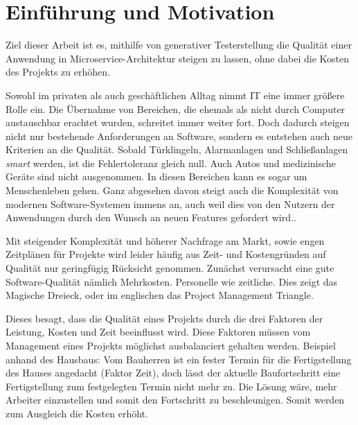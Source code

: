 \documentclass[12pt,a4paper,bibliography=totocnumbered,listof=totocnumbered]{scrartcl}
\begin{document}
\onehalfspacing
\renewcommand{\thesection}{\arabic{section}}
\renewcommand{\theHsection}{\arabic{section}}
\setcounter{section}{0}
\setcounter{page}{1}
\setcounter{secnumdepth}{6}

\section{Einführung und Motivation}

Ziel dieser Arbeit ist es, mithilfe von generativer Testerstellung die Qualität einer Anwendung in Microservice-Architektur steigen zu lassen, ohne dabei die Kosten des Projekts zu erhöhen.

Sowohl im privaten als auch geschäftlichen Alltag nimmt IT eine immer größere Rolle ein. Die Übernahme von Bereichen, die ehemals als nicht durch Computer austauschbar erachtet wurden, schreitet immer weiter fort. Doch dadurch steigen nicht nur bestehende Anforderungen an Software, sondern es entstehen auch neue Kriterien an die Qualität. Sobald Türklingeln, Alarmanlagen und Schließanlagen \textit{smart} werden, ist die Fehlertoleranz gleich null. Auch Autos und medizinische Geräte sind nicht ausgenommen. In diesen Bereichen kann es sogar um Menschenleben gehen. Ganz abgesehen davon steigt auch die Komplexität von modernen Software-Systemen immens an, auch weil dies von den Nutzern der Anwendungen durch den Wunsch an neuen Features gefordert wird.\cite{pantesting}.

Mit steigender Komplexität und höherer Nachfrage am Markt, sowie engen Zeitplänen für Projekte wird leider häufig aus Zeit- und Kostengründen auf Qualität nur geringfügig Rücksicht genommen. Zunächst verursacht eine gute Software-Qualität nämlich Mehrkosten. Personelle wie zeitliche. Dies zeigt das Magische Dreieck, oder im englischen das Project Management Triangle.


Dieses besagt, dass die Qualität eines Projekts durch die drei Faktoren der Leistung, Kosten und Zeit beeinflusst wird. Diese Faktoren müssen vom Management eines Projekts möglichst ausbalanciert gehalten werden. Beispiel anhand des Hausbaus: Vom Bauherren ist ein fester Termin für die Fertigstellung des Hauses angedacht (Faktor Zeit), doch lässt der aktuelle Baufortschritt eine Fertigstellung zum festgelegten Termin nicht mehr zu. Die Lösung wäre, mehr Arbeiter einzustellen und somit den Fortschritt zu beschleunigen. Somit werden zum Ausgleich die Kosten erhöht.
\end{document}
